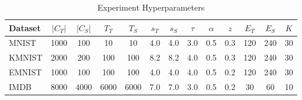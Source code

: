 \begin{table}
	\centering
	\caption{Experiment Hyperparameters }
	\label{tab:hyperparams-dkd}
	\begin{tabular}{lcccccccccccc}
		\hline
		Dataset & $|C_T|$ & $|C_S|$ & $T_T$ & $T_S$ & $s_T$ & $s_S$ & $\tau$ & $\alpha$ & $z$ & $E_T$ & $E_S$ & $K$ \\
		\hline
		MNIST & 1000 & 100 & 10 & 10 & 4.0 & 4.0 & 3.0 & 0.5 & 0.3 & 120 & 240 & 30 \\
		KMNIST & 2000 & 200 & 100 & 100 & 8.2 & 8.2 & 4.0 & 0.5 & 0.3 & 120 & 240 & 30 \\
		EMNIST & 1000 & 100 & 100 & 100 & 4.0 & 4.0 & 4.0 & 0.5 & 0.2 & 120 & 240 & 30 \\
		IMDB & 8000 & 4000 & 6000 & 6000 & 7.0 & 7.0 & 3.0 & 0.5 & 0.2 & 30 & 60 & 10 \\
		\hline
	\end{tabular}
\end{table}